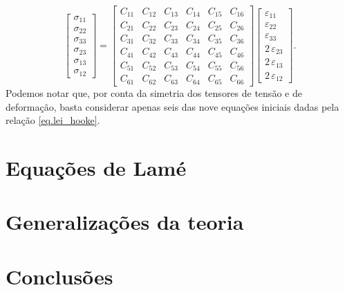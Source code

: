 \begin{equation*}
\begin{bmatrix}
\sigma_{11}\\
\sigma_{22}\\
\sigma_{33}\\
\sigma_{23}\\
\sigma_{13}\\
\sigma_{12}
\end{bmatrix}=
\begin{bmatrix}
C_{11}&C_{12}&C_{13}&C_{14}&C_{15}&C_{16}\\
C_{21}&C_{22}&C_{23}&C_{24}&C_{25}&C_{26}\\
C_{31}&C_{32}&C_{33}&C_{34}&C_{35}&C_{36}\\
C_{41}&C_{42}&C_{43}&C_{44}&C_{45}&C_{46}\\
C_{51}&C_{52}&C_{53}&C_{54}&C_{55}&C_{56}\\
C_{61}&C_{62}&C_{63}&C_{64}&C_{65}&C_{66}
\end{bmatrix}
\begin{bmatrix}
\varepsilon_{11}\\
\varepsilon_{22}\\
\varepsilon_{33}\\
2\,\varepsilon_{23}\\
2\,\varepsilon_{13}\\
2\,\varepsilon_{12}
\end{bmatrix}.
\end{equation*}
Podemos notar que, por conta da simetria dos tensores de tens\~ao e de deforma\c{c}\~ao, basta considerar apenas seis das nove equa\c{c}\~oes iniciais dadas pela rela\c{c}\~ao \ref{eq.lei_hooke}.  


\section{Equações de Lamé}

\section{Generalizações da teoria}

\section{Conclusões}
